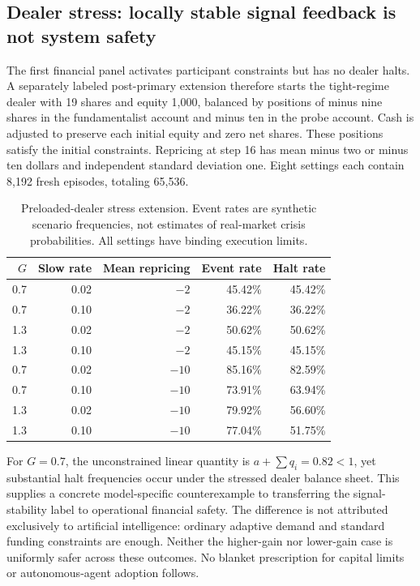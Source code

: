 \documentclass[11pt,a4paper]{article}
\theoremstyle{definition}
\theoremstyle{remark}
\begin{document}
\subsection{Dealer stress: locally stable signal feedback is not system safety}
The first financial panel activates participant constraints but has no dealer halts. A separately labeled post-primary extension therefore starts the tight-regime dealer with 19 shares and equity 1,000, balanced by positions of minus nine shares in the fundamentalist account and minus ten in the probe account. Cash is adjusted to preserve each initial equity and zero net shares. These positions satisfy the initial constraints. Repricing at step 16 has mean minus two or minus ten dollars and independent standard deviation one. Eight settings each contain 8,192 fresh episodes, totaling 65,536.

\begin{table}[htbp]
\centering\small
\caption{Preloaded-dealer stress extension. Event rates are synthetic scenario frequencies, not estimates of real-market crisis probabilities. All settings have binding execution limits.}
\label{tab:dealer_stress}
\begin{tabular}{r r r r r}
\toprule
$G$ & Slow rate & Mean repricing & Event rate & Halt rate\\
\midrule
0.7 & 0.02 & $-2$ & 45.42\% & 45.42\%\\
0.7 & 0.10 & $-2$ & 36.22\% & 36.22\%\\
1.3 & 0.02 & $-2$ & 50.62\% & 50.62\%\\
1.3 & 0.10 & $-2$ & 45.15\% & 45.15\%\\
0.7 & 0.02 & $-10$ & 85.16\% & 82.59\%\\
0.7 & 0.10 & $-10$ & 73.91\% & 63.94\%\\
1.3 & 0.02 & $-10$ & 79.92\% & 56.60\%\\
1.3 & 0.10 & $-10$ & 77.04\% & 51.75\%\\
\bottomrule
\end{tabular}
\end{table}

For $G=0.7$, the unconstrained linear quantity is $a+\sum q_i=0.82<1$, yet substantial halt frequencies occur under the stressed dealer balance sheet. This supplies a concrete model-specific counterexample to transferring the signal-stability label to operational financial safety. The difference is not attributed exclusively to artificial intelligence: ordinary adaptive demand and standard funding constraints are enough. Neither the higher-gain nor lower-gain case is uniformly safer across these outcomes. No blanket prescription for capital limits or autonomous-agent adoption follows.
\end{document}
